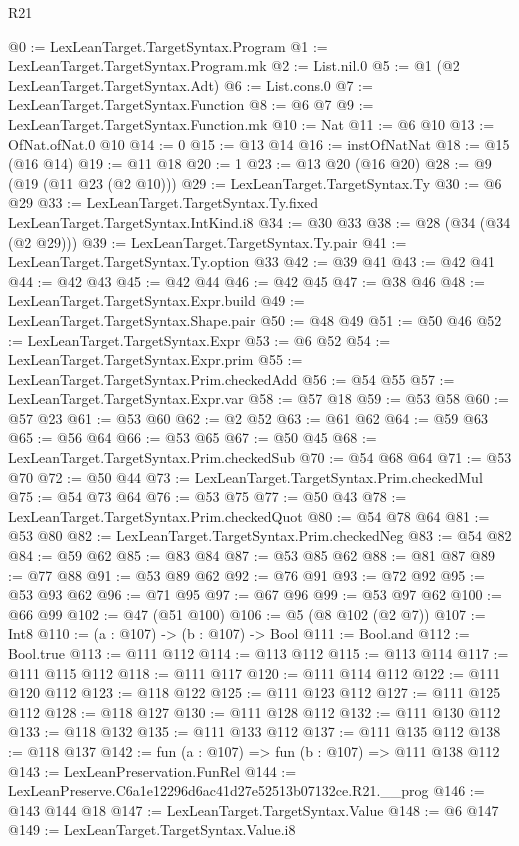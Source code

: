 \begin{lexlean}{R21}
\begin{coremodule}
@0 := LexLeanTarget.TargetSyntax.Program
@1 := LexLeanTarget.TargetSyntax.Program.mk
@2 := List.nil.{0}
@5 := @1 (@2 LexLeanTarget.TargetSyntax.Adt)
@6 := List.cons.{0}
@7 := LexLeanTarget.TargetSyntax.Function
@8 := @6 @7
@9 := LexLeanTarget.TargetSyntax.Function.mk
@10 := Nat
@11 := @6 @10
@13 := OfNat.ofNat.{0} @10
@14 := 0
@15 := @13 @14
@16 := instOfNatNat
@18 := @15 (@16 @14)
@19 := @11 @18
@20 := 1
@23 := @13 @20 (@16 @20)
@28 := @9 (@19 (@11 @23 (@2 @10)))
@29 := LexLeanTarget.TargetSyntax.Ty
@30 := @6 @29
@33 := LexLeanTarget.TargetSyntax.Ty.fixed LexLeanTarget.TargetSyntax.IntKind.i8
@34 := @30 @33
@38 := @28 (@34 (@34 (@2 @29)))
@39 := LexLeanTarget.TargetSyntax.Ty.pair
@41 := LexLeanTarget.TargetSyntax.Ty.option @33
@42 := @39 @41
@43 := @42 @41
@44 := @42 @43
@45 := @42 @44
@46 := @42 @45
@47 := @38 @46
@48 := LexLeanTarget.TargetSyntax.Expr.build
@49 := LexLeanTarget.TargetSyntax.Shape.pair
@50 := @48 @49
@51 := @50 @46
@52 := LexLeanTarget.TargetSyntax.Expr
@53 := @6 @52
@54 := LexLeanTarget.TargetSyntax.Expr.prim
@55 := LexLeanTarget.TargetSyntax.Prim.checkedAdd
@56 := @54 @55
@57 := LexLeanTarget.TargetSyntax.Expr.var
@58 := @57 @18
@59 := @53 @58
@60 := @57 @23
@61 := @53 @60
@62 := @2 @52
@63 := @61 @62
@64 := @59 @63
@65 := @56 @64
@66 := @53 @65
@67 := @50 @45
@68 := LexLeanTarget.TargetSyntax.Prim.checkedSub
@70 := @54 @68 @64
@71 := @53 @70
@72 := @50 @44
@73 := LexLeanTarget.TargetSyntax.Prim.checkedMul
@75 := @54 @73 @64
@76 := @53 @75
@77 := @50 @43
@78 := LexLeanTarget.TargetSyntax.Prim.checkedQuot
@80 := @54 @78 @64
@81 := @53 @80
@82 := LexLeanTarget.TargetSyntax.Prim.checkedNeg
@83 := @54 @82
@84 := @59 @62
@85 := @83 @84
@87 := @53 @85 @62
@88 := @81 @87
@89 := @77 @88
@91 := @53 @89 @62
@92 := @76 @91
@93 := @72 @92
@95 := @53 @93 @62
@96 := @71 @95
@97 := @67 @96
@99 := @53 @97 @62
@100 := @66 @99
@102 := @47 (@51 @100)
@106 := @5 (@8 @102 (@2 @7))
@107 := Int8
@110 := (a : @107) -> (b : @107) -> Bool
@111 := Bool.and
@112 := Bool.true
@113 := @111 @112
@114 := @113 @112
@115 := @113 @114
@117 := @111 @115 @112
@118 := @111 @117
@120 := @111 @114 @112
@122 := @111 @120 @112
@123 := @118 @122
@125 := @111 @123 @112
@127 := @111 @125 @112
@128 := @118 @127
@130 := @111 @128 @112
@132 := @111 @130 @112
@133 := @118 @132
@135 := @111 @133 @112
@137 := @111 @135 @112
@138 := @118 @137
@142 := fun (a : @107) => fun (b : @107) => @111 @138 @112
@143 := LexLeanPreservation.FunRel
@144 := LexLeanPreserve.C6a1e12296d6ac41d27e52513b07132ce.R21.__prog
@146 := @143 @144 @18
@147 := LexLeanTarget.TargetSyntax.Value
@148 := @6 @147
@149 := LexLeanTarget.TargetSyntax.Value.i8

\end{coremodule}
\end{lexlean}
